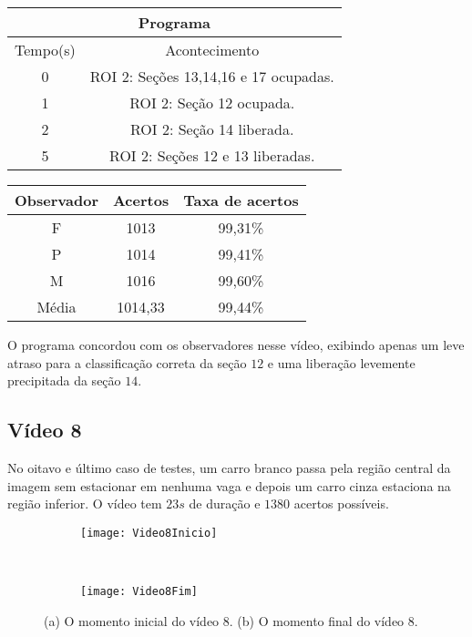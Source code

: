 \begin{center}
\begin{tabular}{|c||c|}
\hline
\multicolumn{2}{|c|}{Programa}  \\ \hline \hline
Tempo(s) & Acontecimento \\ \hline
0 & ROI 2: Seções 13,14,16 e 17 ocupadas. \\ \hline
1 & ROI 2: Seção 12 ocupada. \\ \hline
2 & ROI 2: Seção 14 liberada. \\ \hline
5 & ROI 2: Seções 12 e 13 liberadas. \\
\hline
\end{tabular}
\end{center}

\begin{center}
\begin{tabular}{|c||c||c|}
\hline
Observador & Acertos & Taxa de acertos \\ \hline
F & 1013 & 99,31\% \\  \hline
P & 1014 & 99,41\% \\ \hline
M & 1016 & 99,60\% \\ \hline
Média & 1014,33 & 99,44\% \\
\hline
\end{tabular}
\end{center}

O programa concordou com os observadores nesse vídeo, exibindo apenas um leve atraso para a classificação correta da seção $12$ e uma liberação levemente precipitada da seção $14$.

\subsection{Vídeo 8}

No oitavo e último caso de testes, um carro branco passa pela região central da imagem sem estacionar em nenhuma vaga e depois um carro cinza estaciona na região inferior. O vídeo tem $23s$ de duração e $1380$ acertos possíveis.

\begin{figure}[!h]
\centering
\begin{subfigure}{.5\textwidth}
\centering
\texttt{[image: Video8Inicio]}
\caption{}
\end{subfigure}\
\begin{subfigure}{.5\textwidth}
\centering
\texttt{[image: Video8Fim]}
\caption{}
\end{subfigure}
\centering
\caption{(a) O momento inicial do vídeo 8. (b) O momento final do vídeo 8.}%
\label{}%
\end{figure}

